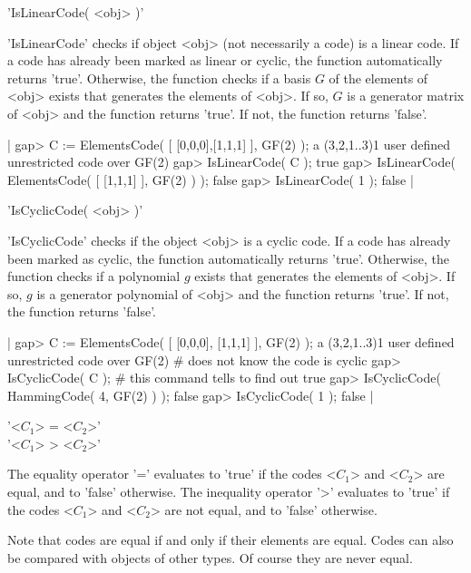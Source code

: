 'IsLinearCode( <obj> )'

'IsLinearCode' checks  if object <obj>   (not  necessarily a code) is   a
linear code. If a code  has already been marked  as linear or cyclic, the
function automatically returns 'true'.  Otherwise, the function checks if
a basis $G$  of the elements of <obj>  exists that generates the elements
of <obj>. If   so, $G$ is  a generator  matrix of <obj>  and the function
returns 'true'. If not, the function returns 'false'.

|    gap> C := ElementsCode( [ [0,0,0],[1,1,1] ], GF(2) );
    a (3,2,1..3)1 user defined unrestricted code over GF(2)
    gap> IsLinearCode( C );
    true
    gap> IsLinearCode( ElementsCode( [ [1,1,1] ], GF(2) ) );
    false
    gap> IsLinearCode( 1 );
    false |


'IsCyclicCode( <obj> )'

'IsCyclicCode' checks if the object <obj> is a cyclic code. If a code has
already been marked as cyclic, the function automatically returns 'true'.
Otherwise, the function checks if  a polynomial $g$ exists that generates
the elements of <obj>. If so, $g$ is a generator  polynomial of <obj> and
the function returns 'true'. If not, the function returns 'false'.

|    gap> C := ElementsCode( [ [0,0,0], [1,1,1] ], GF(2) );
    a (3,2,1..3)1 user defined unrestricted code over GF(2)
    # {\GUAVA} does not know the code is cyclic
    gap> IsCyclicCode( C );      # this command tells {\GUAVA} to find out
    true
    gap> IsCyclicCode( HammingCode( 4, GF(2) ) );
    false
    gap> IsCyclicCode( 1 );
    false |


'<$C_1$> = <$C_2$>'\\
'<$C_1$> \<> <$C_2$>'

The equality operator  '=' evaluates to 'true'  if the codes  <$C_1$> and
<$C_2$>  are equal,  and to  'false'  otherwise. The  inequality operator
'\<>' evaluates to 'true' if the codes <$C_1$> and <$C_2$> are not equal,
and to 'false' otherwise.

Note that codes are equal if and only  if their elements are equal. Codes
can also  be compared  with  objects of other  types.  Of course they are
never equal.

